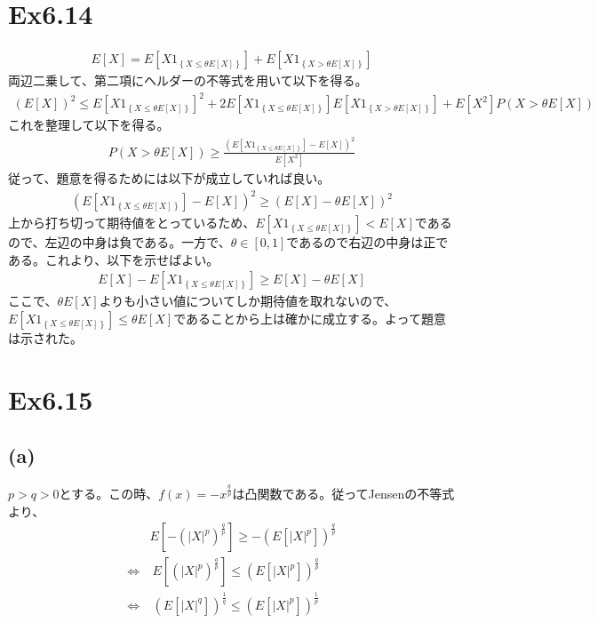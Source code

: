 \documentclass{article}
\begin{document}
\section{Ex6.14}
\begin{align*}
	E[X] = E\left[ X 1_{\left\{ X \leq \theta E[X] \right\}} \right] + E\left[ X 1_{\left\{ X > \theta E[X] \right\}} \right]
\end{align*}
両辺二乗して、第二項にヘルダーの不等式を用いて以下を得る。
\begin{align*}
	\left( E[X] \right)^2 \leq E\left[ X 1_{\left\{ X \leq \theta E[X] \right\}} \right]^2 + 2 E\left[ X 1_{\left\{ X \leq \theta E[X] \right\}} \right] E\left[ X 1_{\left\{ X > \theta E[X] \right\}} \right] + E[X^2] P\left( X > \theta E[X] \right)
\end{align*}
これを整理して以下を得る。
\begin{align*}
	P\left( X > \theta E[X] \right) \geq \frac{\left( E\left[ X 1_{\left\{ X \leq \theta E[X] \right\}} \right] - E[X] \right)^2}{E[X^2]}
\end{align*}
従って、題意を得るためには以下が成立していれば良い。
\begin{align*}
	\left( E\left[ X 1_{\left\{ X \leq \theta E[X] \right\}} \right] - E[X] \right)^2 \geq \left( E[X] - \theta E[X] \right)^2
\end{align*}
上から打ち切って期待値をとっているため、$E\left[ X 1_{\left\{ X \leq \theta E[X] \right\}} \right] < E[X]$であるので、左辺の中身は負である。一方で、$\theta \in [0,1]$であるので右辺の中身は正である。これより、以下を示せばよい。
\begin{align*}
	E[X] - E\left[ X 1_{\left\{ X \leq \theta E[X] \right\}} \right]  \geq E[X] - \theta E[X] 
\end{align*}
ここで、$\theta E[X]$よりも小さい値についてしか期待値を取れないので、$E\left[ X 1_{\left\{ X \leq \theta E[X] \right\}} \right] \leq \theta E[X]$であることから上は確かに成立する。よって題意は示された。

\section{Ex6.15}
\subsection{(a)}
$p > q > 0$とする。この時、$f(x) = -x^{\frac{q}{p}}$は凸関数である。従ってJensenの不等式より、
\begin{align*}
	&E\left[ -\left( |X|^p \right)^{\frac{q}{p}} \right] \geq - \left( E\left[ |X|^p \right]\right)^{\frac{q}{p}}\\[8pt]
	\Leftrightarrow&\ E[\left( |X|^p \right)^{\frac{q}{p}}] \leq \left( E[|X|^p] \right)^{\frac{q}{p}}\\[8pt]
	\Leftrightarrow&\ \left( E[|X|^q]\right)^{\frac{1}{q}} \leq \left( E[|X|^p]\right)^{\frac{1}{p}}
\end{align*}
\end{document}
